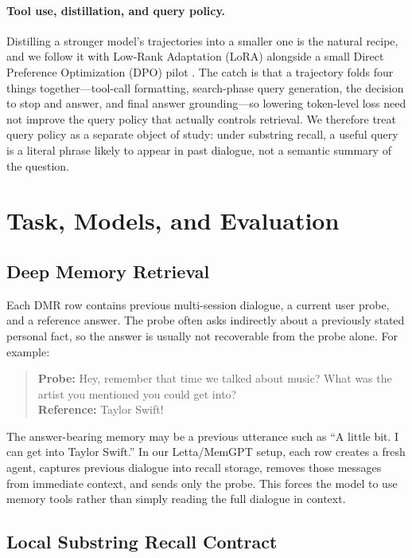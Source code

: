 \documentclass[11pt]{article}
\begin{document}
\paragraph{Tool use, distillation, and query policy.}
Distilling a stronger model's trajectories into a smaller one is the natural recipe, and we follow it with Low-Rank Adaptation (LoRA) \citep{hu2021lora} alongside a small Direct Preference Optimization (DPO) pilot \citep{rafailov2023dpo}. The catch is that a trajectory folds four things together---tool-call formatting, search-phase query generation, the decision to stop and answer, and final answer grounding---so lowering token-level loss need not improve the query policy that actually controls retrieval. We therefore treat query policy as a separate object of study: under substring recall, a useful query is a literal phrase likely to appear in past dialogue, not a semantic summary of the question.

\section{Task, Models, and Evaluation}

\subsection{Deep Memory Retrieval}

Each DMR row contains previous multi-session dialogue, a current user probe, and a reference answer. The probe often asks indirectly about a previously stated personal fact, so the answer is usually not recoverable from the probe alone. For example:
\begin{quote}\small
\textbf{Probe:} Hey, remember that time we talked about music? What was the artist you mentioned you could get into?\\
\textbf{Reference:} Taylor Swift!
\end{quote}
The answer-bearing memory may be a previous utterance such as ``A little bit. I can get into Taylor Swift.'' In our Letta/MemGPT setup, each row creates a fresh agent, captures previous dialogue into recall storage, removes those messages from immediate context, and sends only the probe. This forces the model to use memory tools rather than simply reading the full dialogue in context.

\subsection{Local Substring Recall Contract}
\end{document}
